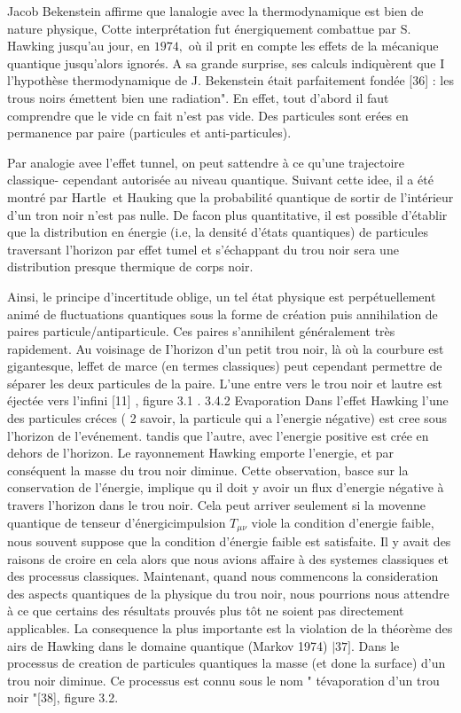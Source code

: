 Jacob Bekenstein affirme que lanalogie avec la thermodynamique est bien de nature physique, Cotte interprétation fut énergiquement combattue par S. Hawking jusqu'au jour, en $1974,$ où il prit en compte les effets de la mécanique quantique jusqu'alors ignorés. A sa grande surprise, ses calculs indiquèrent que I l'hypothèse thermodynamique de J. Bekenstein était parfaitement fondée [36] :
les trous noirs émettent bien une radiation".
En effet, tout d'abord il faut comprendre que le vide $\mathrm{cn}$ fait n'est pas vide. Des particules sont erées en permanence par paire (particules et anti-particules).

Par analogie avee l'effet tunnel, on peut sattendre à ce qu'une trajectoire classique-
cependant autorisée au niveau quantique. Suivant cette idee, il a été montré par $\mathrm{Hartle } ~$ et Hauking que la probabilité quantique de sortir de l'intérieur d'un tron noir n'est pas nulle. De facon plus quantitative, il est possible d'établir que la distribution en énergie (i.e, la densité d'états quantiques) de particules traversant l'horizon par effet tumel et s'échappant du trou noir sera une distribution presque thermique de corps noir.

Ainsi, le principe d'incertitude oblige, un tel état physique est perpétuellement animé de fluctuations quantiques sous la forme de création puis annihilation de paires particule/antiparticule. Ces paires s'annihilent généralement très rapidement. Au voisinage de I'horizon d'un petit trou noir, là où la courbure est gigantesque, leffet de marce (en termes classiques) peut cependant permettre de séparer les deux particules de la paire. L'une entre vers le trou noir et lautre est éjectée vers l'infini [11] , figure 3.1 .
3.4.2 Evaporation
Dans l'effet Hawking l'une des particules créces ( 2 savoir, la particule qui a l'energie négative) est cree sous l'horizon de l'evénement. tandis que l'autre, avec l'energie positive est crée en dehors de l'horizon. Le rayonnement Hawking emporte l'energie, et par conséquent la masse du trou noir diminue. Cette observation, basce sur la conservation de l'énergie, implique qu il doit y avoir un flux d'energie négative à travers l'horizon dans le trou noir. Cela peut arriver seulement si la movenne quantique de tenseur d'énergicimpulsion $T_{\mu \nu}$ viole la condition d'energie faible, nous souvent suppose que la condition d'énergie faible est satisfaite. Il y avait des raisons de croire en cela alors que nous avions affaire à des systemes classiques et des processus classiques. Maintenant, quand nous commencons la consideration des aspects quantiques de la physique du trou noir, nous pourrions nous attendre à ce que certains des résultats prouvés plus tôt ne soient pas directement applicables. La consequence la plus importante est la violation de la théorème des airs de Hawking dans le domaine quantique (Markov 1974) $\mid 37]$. Dans le processus de creation de particules quantiques la masse (et done la surface) d'un trou noir diminue. Ce processus est connu sous le nom " tévaporation d'un trou noir "[38], figure 3.2.
